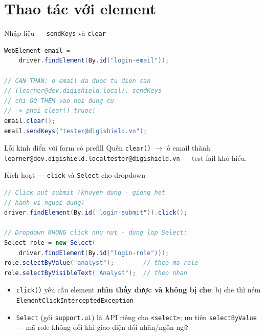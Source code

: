 \documentclass[aspectratio=169,12pt]{beamer}
\begin{document}
\section{Thao tác với element}

\begin{frame}[fragile]{Nhập liệu --- \texttt{sendKeys} và \texttt{clear}}
\begin{lstlisting}[language=java,basicstyle=\ttfamily\scriptsize]
WebElement email =
    driver.findElement(By.id("login-email"));

// CAN THAN: o email da duoc tu dien san
// (learner@dev.digishield.local). sendKeys
// chi GO THEM vao noi dung cu
// -> phai clear() truoc!
email.clear();
email.sendKeys("tester@digishield.vn");
\end{lstlisting}

  \begin{alertblock}{Lỗi kinh điển với form có prefill}
    Quên \texttt{clear()} $\to$ ô email thành
    \texttt{learner@dev.digishield.localtester@digishield.vn}
    --- test fail khó hiểu.
  \end{alertblock}
\end{frame}

\begin{frame}[fragile]{Kích hoạt --- \texttt{click} và \texttt{Select} cho dropdown}
\begin{lstlisting}[language=java]
// Click nut submit (khuyen dung - giong het
// hanh vi nguoi dung)
driver.findElement(By.id("login-submit")).click();

// Dropdown KHONG click nhu nut - dung lop Select:
Select role = new Select(
    driver.findElement(By.id("login-role")));
role.selectByValue("analyst");        // theo ma role
role.selectByVisibleText("Analyst");  // theo nhan
\end{lstlisting}

  \begin{itemize}
    \item \texttt{click()} yêu cầu element \textbf{nhìn thấy được và không bị che};
          bị che thì ném \texttt{ElementClickInterceptedException}
    \item \texttt{Select} (gói \texttt{support.ui}) là API riêng cho
          \texttt{<select>}; ưu tiên \texttt{selectByValue} --- mã role
          không đổi khi giao diện đổi nhãn/ngôn ngữ
  \end{itemize}
\end{frame}
\end{document}
